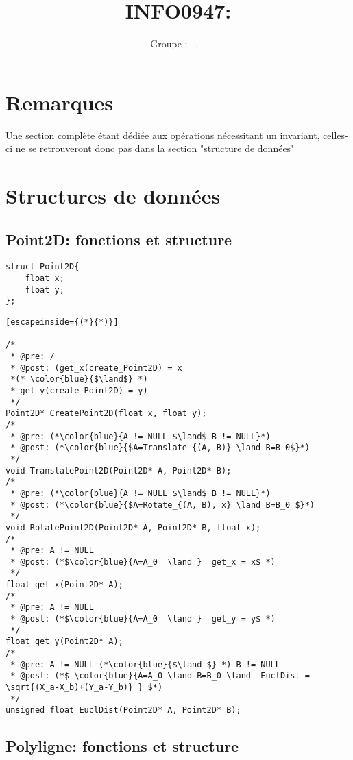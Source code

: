 \documentclass[a4paper, 11pt, oneside]{article}
\title{INFO0947: \intitule}
\author{Groupe \GrNbr : \PrenomUN~\textsc{\NomUN}, \PrenomDEUX~\textsc{\NomDEUX}}
\date{}
\newcommand{\tablemat}{~}
\renewcommand{\tablemat}{\tableofcontents}
\begin{document}
\maketitle
\newpage
\tablemat
\newpage

\section{Remarques}

Une section complète étant dédiée aux opérations nécessitant un invariant, celles-ci ne se retrouveront donc pas dans la section "structure de données"

\section{Structures de données}
\subsection{Point2D: fonctions et structure}

\begin{lstlisting}
struct Point2D{
	float x;
	float y;
};
\end{lstlisting}

\begin{lstlisting}[escapeinside={(*}{*)}]

/* 
 * @pre: /
 * @post: (get_x(create_Point2D) = x 
 *(* \color{blue}{$\land$} *)
 * get_y(create_Point2D) = y) 
 */
Point2D* CreatePoint2D(float x, float y);
/* 
 * @pre: (*\color{blue}{A != NULL $\land$ B != NULL}*)
 * @post: (*\color{blue}{$A=Translate_{(A, B)} \land B=B_0$}*)
 */
void TranslatePoint2D(Point2D* A, Point2D* B);
/* 
 * @pre: (*\color{blue}{A != NULL $\land$ B != NULL}*)
 * @post: (*\color{blue}{$A=Rotate_{(A, B), x} \land B=B_0 $}*)
 */
void RotatePoint2D(Point2D* A, Point2D* B, float x);
/* 
 * @pre: A != NULL
 * @post: (*$\color{blue}{A=A_0  \land }  get_x = x$ *)
 */
float get_x(Point2D* A);
/* 
 * @pre: A != NULL
 * @post: (*$\color{blue}{A=A_0  \land }  get_y = y$ *)
 */
float get_y(Point2D* A);
/* 
 * @pre: A != NULL (*\color{blue}{$\land $} *) B != NULL
 * @post: (*$ \color{blue}{A=A_0 \land B=B_0 \land  EuclDist = \sqrt{(X_a-X_b)+(Y_a-Y_b)} } $*)
 */
unsigned float EuclDist(Point2D* A, Point2D* B);
\end{lstlisting}

\subsection{Polyligne: fonctions et structure}
\end{document}
